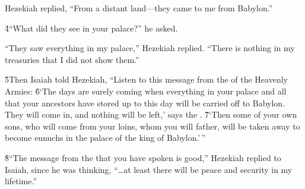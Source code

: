 Hezekiah replied, ``From a distant land---they came to me from Babylon.''

\v{4}``What did they see in your palace?'' he asked.

``They saw everything in my palace,'' Hezekiah replied. ``There is nothing in my treasuries that I did not show them.''

\v{5}Then Isaiah told Hezekiah, ``Listen to this message from the  of the Heavenly Armies: \v{6}`The days are surely coming when everything in your palace and all that your ancestors have stored up to this day will be carried off to Babylon. They will come in, and nothing will be left,' says the . \v{7}`Then some of your own sons, who will come from your loins, whom you will father, will be taken away to become eunuchs in the palace of the king of Babylon.'\,''

\v{8}``The message from the  that you have spoken is good,'' Hezekiah replied to Isaiah, since he was thinking, ``{\ldots}at least there will be peace and security in my lifetime.''

